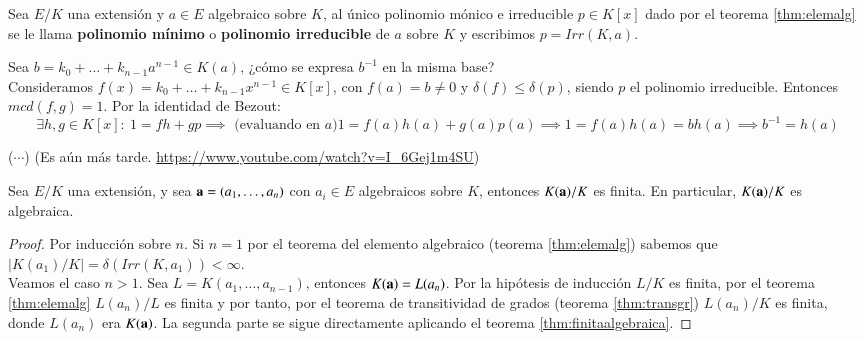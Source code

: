 \begin{dfn}
    Sea $E/K$ una extensión y $a\in E$ algebraico sobre $K$, al único polinomio mónico e irreducible $p \in K[x]$ dado por el teorema \ref{thm:elemalg} se le llama \textbf{polinomio mínimo} o \textbf{polinomio irreducible} de $a$ sobre $K$ y escribimos $p = Irr(K, a)$.
\end{dfn}

\begin{obs}
    Sea $b = k_0 + \ldots + k_{n-1} a^{n-1} \in K(a)$, ¿cómo se expresa $b^{-1}$ en la misma base?\\
    Consideramos $f(x) = k_0 + \ldots + k_{n-1}x^{n-1} \in K[x]$, con $f(a) = b \neq 0$ y $\delta(f) \leq \delta(p)$, siendo $p$ el polinomio irreducible. Entonces $mcd(f, g) = 1$. Por la identidad de Bezout:
    $$
        \exists h, g \in K[x]:\ 1 = fh + gp \implies \text{ (evaluando en $a$)} 1 = f(a)h(a) + g(a)p(a) \implies 1 = f(a)h(a) = b h(a) \implies b^{-1} = h(a)
    $$
\end{obs}

\begin{eg}
    ($\cdots$) (Es aún más tarde. \url{https://www.youtube.com/watch?v=I_6Gej1m4SU}) %
\end{eg}

\begin{thm}\label{thm:extalg}\label{thm:2.4} %
    Sea $E/K$ una extensión, y sea $\mathbf{a} = (a_1, \ldots, a_n)$ con $a_i \in E$ algebraicos sobre $K$, entonces $K(\mathbf{a})/K$ es finita. En particular, $K(\mathbf{a})/K$ es algebraica.
\end{thm}

\begin{proof}
    Por inducción sobre $n$. Si $n=1$ por el teorema del elemento algebraico (teorema \ref{thm:elemalg}) sabemos que $|K(a_1)/K| = \delta(Irr(K, a_1)) < \infty$.\\
    Veamos el caso $n>1$. Sea $L = K(a_1, \ldots, a_{n-1})$, entonces $K(\mathbf{a}) = L(a_n)$. Por la hipótesis de inducción $L/K$ es finita, por el teorema \ref{thm:elemalg} $L(a_n)/L$ es finita y por tanto, por el teorema de transitividad de grados (teorema \ref{thm:transgr}) $L(a_n)/K$ es finita, donde $L(a_n)$ era $K(\mathbf{a})$. La segunda parte se sigue directamente aplicando el teorema \ref{thm:finitaalgebraica}.
\end{proof}

